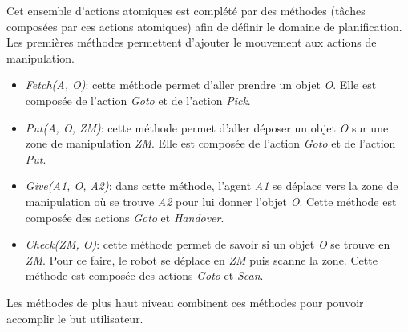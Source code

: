 \documentclass[a4paper,11pt,twoside]{StyleThese}
\begin{document}
 Cet ensemble d'actions atomiques est complété par des méthodes (tâches composées par ces actions atomiques) afin de définir le domaine de planification.
 Les premières méthodes permettent d'ajouter le mouvement aux actions de manipulation.
 
 \begin{itemize}

\item \textit{Fetch(A, O)}: cette méthode permet d'aller prendre un objet \textit{O}. Elle est composée de l'action \textit{Goto} et de l'action \textit{Pick}.

\item \textit{Put(A, O, ZM)}: cette méthode permet d'aller déposer un objet \textit{O} sur une zone de manipulation \textit{ZM}. Elle est composée de l'action \textit{Goto} et de l'action \textit{Put}.

\item \textit{Give(A1, O, A2)}: dans cette méthode, l'agent \textit{A1} se déplace vers la zone de manipulation où se trouve \textit{A2} pour lui donner l'objet \textit{O}. Cette méthode est composée des actions \textit{Goto} et \textit{Handover}.

\item \textit{Check(ZM, O)}: cette méthode permet de savoir si un objet \textit{O} se trouve en \textit{ZM}. Pour ce faire, le robot se déplace en \textit{ZM} puis scanne la zone. Cette méthode est composée des actions \textit{Goto} et \textit{Scan}.

\end{itemize}

Les méthodes de plus haut niveau combinent ces méthodes pour pouvoir accomplir le but utilisateur.
\end{document}
